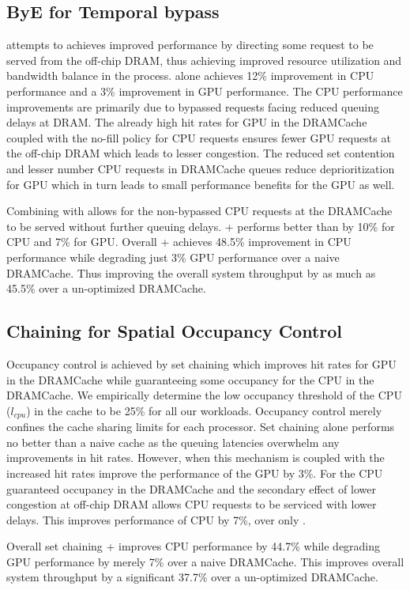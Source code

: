 \subsection{ByE for Temporal bypass}
\par \bypassname attempts to achieves improved performance by directing some request to be served from the off-chip DRAM, thus achieving improved resource utilization and bandwidth balance in the process. \bypassname alone achieves 12\% improvement in CPU performance and a 3\% improvement in GPU performance. The CPU performance improvements are primarily due to bypassed requests facing reduced queuing delays at DRAM. The already high hit rates for GPU in the DRAMCache coupled with the no-fill policy for CPU requests ensures fewer GPU requests at the off-chip DRAM which leads to lesser congestion. The reduced set contention and lesser number CPU requests in DRAMCache queues reduce deprioritization for GPU which in turn leads to small performance benefits for the GPU as well.
\par Combining \bypassname with \prioname allows for the non-bypassed CPU requests at the DRAMCache to be served without further queuing delays. \bypassname + \prioname performs better than \prioname by 10\% for CPU and 7\% for GPU. Overall \bypassname + \prioname achieves 48.5\% improvement in CPU performance while degrading just 3\% GPU performance over a naive DRAMCache. Thus improving the overall system throughput by as much as 45.5\% over a un-optimized DRAMCache.

\subsection{Chaining for Spatial Occupancy Control}
Occupancy control is achieved by set chaining which improves hit rates for GPU in the DRAMCache while guaranteeing some occupancy for the CPU in the DRAMCache. We empirically determine the low occupancy threshold of the CPU (\textit{$l_{cpu}$}) in the cache to be 25\% for all our workloads. Occupancy control merely confines the cache sharing limits for each processor. Set chaining alone performs no better than a naive cache as the queuing latencies overwhelm any improvements in hit rates. However, when this mechanism is coupled with \prioname the increased hit rates improve the performance of the GPU by 3\%. For the CPU guaranteed occupancy in the DRAMCache and the secondary effect of lower congestion at off-chip DRAM allows CPU requests to be serviced with lower delays. This improves performance of CPU by 7\%, over only \prioname.
\par Overall set chaining + \prioname improves CPU performance by 44.7\% while degrading GPU performance by merely 7\% over a naive DRAMCache. This improves overall system throughput by a significant 37.7\% over a un-optimized DRAMCache.

